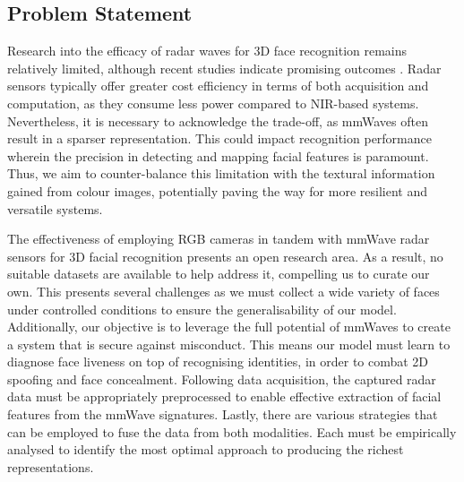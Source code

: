 \documentclass{mpaper}
\begin{document}
\subsection{Problem Statement}
Research into the efficacy of radar waves for 3D face recognition remains relatively limited, although recent studies indicate promising outcomes \cite{hof2020face, lim2020dnn, kim2020face, pho2021radar, challa2021face}. Radar sensors typically offer greater cost efficiency in terms of both acquisition and computation, as they consume less power compared to NIR-based systems. Nevertheless, it is necessary to acknowledge the trade-off, as mmWaves often result in a sparser representation. This could impact recognition performance wherein the precision in detecting and mapping facial features is paramount. Thus, we aim to counter-balance this limitation with the textural information gained from colour images, potentially paving the way for more resilient and versatile systems.

The effectiveness of employing RGB cameras in tandem with mmWave radar sensors for 3D facial recognition presents an open research area. As a result, no suitable datasets are available to help address it, compelling us to curate our own. This presents several challenges as we must collect a wide variety of faces under controlled conditions to ensure the generalisability of our model. Additionally, our objective is to leverage the full potential of mmWaves to create a system that is secure against misconduct. This means our model must learn to diagnose face liveness on top of recognising identities, in order to combat 2D spoofing and face concealment. Following data acquisition, the captured radar data must be appropriately preprocessed to enable effective extraction of facial features from the mmWave signatures. Lastly, there are various strategies that can be employed to fuse the data from both modalities. Each must be empirically analysed to identify the most optimal approach to producing the richest representations.
\end{document}
